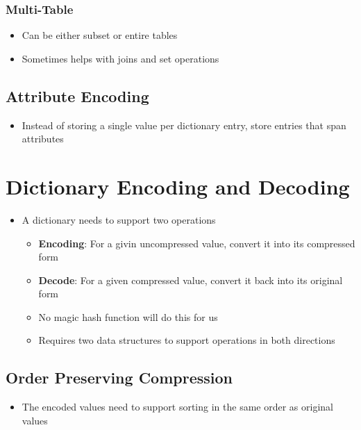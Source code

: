 \documentclass[11pt]{article}
\begin{document}
        \subsubsection*{Multi-Table}
        \begin{itemize}
            \item Can be either subset or entire tables
            \item Sometimes helps with joins and set operations
        \end{itemize}

    \subsection*{Attribute Encoding}
    \begin{itemize}
        \item Instead of storing a single value per dictionary entry, store entries that span attributes
    \end{itemize}

\section{Dictionary Encoding and Decoding}
\begin{itemize}
    \item A dictionary needs to support two operations
    \begin{itemize}
        \item \textbf{Encoding}: For a givin uncompressed value, convert it into its compressed form
        \item \textbf{Decode}: For a given compressed value, convert it back into its original form
        \item No magic hash function will do this for us
        \item Requires two data structures to support operations in both directions
    \end{itemize}
\end{itemize}

    \subsection*{Order Preserving Compression}
    \begin{itemize}
        \item The encoded values need to support sorting in the same order as original values
    \end{itemize}
\end{document}
